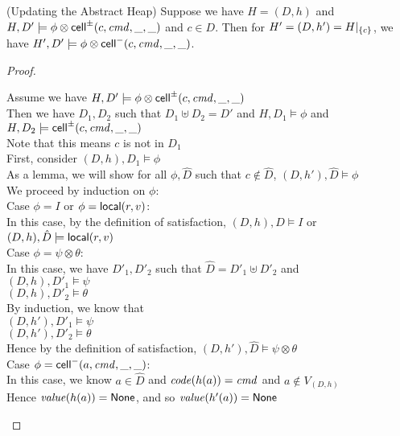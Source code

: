 \begin{lemma}{(Updating the Abstract Heap)}
Suppose we have $H = (D,h)$ and $H, D' \models \phi \otimes
\mathsf{cell}^{\pm}({c}, {\mathit{cmd}}, {\_}, {\_})$ and $c \in D$. Then for $H' = (D, h') = H|_{\{{c}\}}$, we
have $H', D' \models \phi \otimes \mathsf{cell}^{-}({c}, {\mathit{cmd}}, {\_}, {\_})$.
\end{lemma}

\begin{proof}
\begin{tabbedproof}
\oo Assume we have $H, D' \models \phi \otimes \mathsf{cell}^{\pm}({c}, {\mathit{cmd}}, {\_}, {\_})$ \\
\oo Then we have $D_1, D_2$ such that $D_1 \uplus D_2 = D'$ and $H, D_1 \models \phi$ and $H, D_2 \models \mathsf{cell}^{\pm}({c}, {\mathit{cmd}}, {\_}, {\_})$ \\
\oo Note that this means $c$ is not in $D_1$ \\
\oo First, consider $(D,h), D_1 \models \phi$ \\
\ooo As a lemma, we will show  for all $\phi, \hat{D}$ such that $c \not\in \hat{D}$, $(D,h'), \hat{D} \models \phi$ \\
\ooo We proceed by induction on $\phi$: \\
\ooo Case $\phi = I$ or $\phi = \mathsf{local}({r}, {v})$: \\
\oooo In this case, by the definition of satisfaction, $(D,h), \hat{D} \models I$ or $(D,h), \hat{D} \models \mathsf{local}({r}, {v})$\\
\ooo Case $\phi = \psi \otimes \theta$: \\
\oooo In this case, we have $D'_1, D'_2$ such that $\hat{D} = D'_1 \uplus D'_2$ and \\
\oooox $(D,h), D'_1 \models \psi$ \\
\oooox $(D,h), D'_2 \models \theta$ \\
\oooo By induction, we know that \\
\oooox $(D,h'), D'_1 \models \psi$ \\
\oooox $(D,h'), D'_2 \models \theta$ \\
\oooo Hence by the definition of satisfaction, $(D,h'), \hat{D} \models \psi \otimes \theta$ \\
\ooo Case $\phi = \mathsf{cell}^{-}({a}, {\mathit{cmd}}, {\_}, {\_})$: \\
\oooo In this case, we know $a \in \hat{D}$ and $\mathit{code}(h(a)) = \mathit{cmd}$ and $a \not\in V_{(D,h)}$ \\
\oooo Hence $\mathit{value}(h(a)) = \mathsf{None}$, and so $\mathit{value}(h'(a)) = \mathsf{None}$ \\

\end{tabbedproof}
\end{proof}
